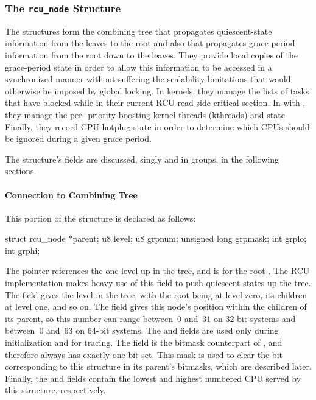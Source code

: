 \subsubsection{The \texttt{rcu\_node} Structure}

The  structures form the combining tree that propagates
quiescent-state information from the leaves to the root and also that
propagates grace-period information from the root down to the leaves.
They provide local copies of the grace-period state in order to allow
this information to be accessed in a synchronized manner without
suffering the scalability limitations that would otherwise be imposed by
global locking.
In  kernels, they manage the lists
of tasks that have blocked while in their current RCU read-side critical
section.
In  with , they
manage the per- priority-boosting kernel threads
(kthreads) and state.
Finally, they record CPU-hotplug state in order to
determine which CPUs should be ignored during a given grace period.

The  structure's fields are discussed, singly and in groups,
in the following sections.

\paragraph{Connection to Combining Tree}

This portion of the  structure is declared as follows:

\begin{VerbatimN}
	struct rcu_node *parent;
	u8 level;
	u8 grpnum;
	unsigned long grpmask;
	int grplo;
	int grphi;
\end{VerbatimN}

The  pointer references the  one level up in the
tree, and is  for the root .
The RCU implementation
makes heavy use of this field to push quiescent states up the tree.
The
 field gives the level in the tree, with the root being at
level zero, its children at level one, and so on.
The  field
gives this node's position within the children of its parent, so this
number can range between~0 and~31 on 32-bit systems and between~0 and~63
on 64-bit systems.
The  and  fields are used only
during initialization and for tracing.
The  field is the
bitmask counterpart of , and therefore always has exactly
one bit set.
This mask is used to clear the bit corresponding to this
 structure in its parent's bitmasks, which are described
later.
Finally, the  and  fields contain the
lowest and highest numbered CPU served by this  structure,
respectively.

